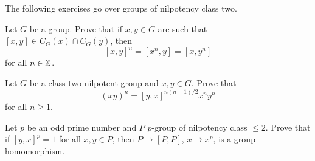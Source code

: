 The following exercises go over groups 
of nilpotency class two. 


\begin{exercise}
\label{xca:commutador}
Let $G$ be a group. Prove that 
if $x,y\in G$ are such that $[x,y]\in C_G(x)\cap C_G(y)$, then 
\[
[x,y]^n=[x^n,y]=[x,y^n]
\]
for all $n\in\mathbb{Z}$.
\end{exercise}


\begin{exercise}[Hall]
\label{xca:Hall}
Let $G$ be a class-two nilpotent group and 
$x,y\in G$. Prove that 
\[
(xy)^n=[y,x]^{n(n-1)/2}x^ny^n
\]
for all $n\geq1$.
\end{exercise}


\begin{exercise}
\label{xca:class2}
Let $p$ be an odd prime number and 
$P$ $p$-group of nilpotency class $\leq2$. 
Prove that if $[y,x]^p=1$ for all $x,y\in P$, then
$P\to [P,P]$,
$x\mapsto x^p$, is a group homomorphism. 
\end{exercise}


